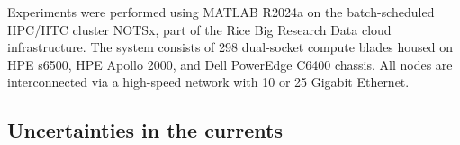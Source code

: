 Experiments were performed using MATLAB R2024a on the batch-scheduled HPC/HTC cluster NOTSx, part of the Rice Big Research Data cloud infrastructure. The system consists of 298 dual-socket compute blades housed on HPE s6500, HPE Apollo 2000, and Dell PowerEdge C6400 chassis. All nodes are interconnected via a high-speed network with 10 or 25 Gigabit Ethernet.


\subsection{Uncertainties in the currents}





